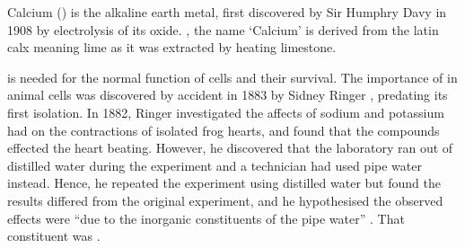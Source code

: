 \documentclass[../main.tex]{subfiles}
\begin{document}
% 
%
%	
% 	
Calcium () is the alkaline earth metal, first discovered by Sir Humphry Davy in 1908 by electrolysis of its oxide. \cite{Davy_1908}, the name `Calcium' is derived from the latin calx meaning lime as it was extracted by heating limestone.

  is needed for the normal function of cells and their survival. The importance of  in animal cells was discovered by accident in 1883 by Sidney Ringer \cite{Ringer_1883}, predating its first isolation. In 1882, Ringer investigated the affects of sodium and potassium had on the contractions of isolated frog hearts, and found that the compounds effected the heart beating. \cite{Ringer_1882} However, he discovered that the laboratory ran out of distilled water during the experiment and a technician had used pipe water instead. Hence, he repeated the experiment using distilled water but found the results differed from the original experiment, and he hypothesised the observed effects were ``due to the inorganic constituents of the pipe water'' \cite{Ringer_1883}. That constituent was .       
 
\end{document}
